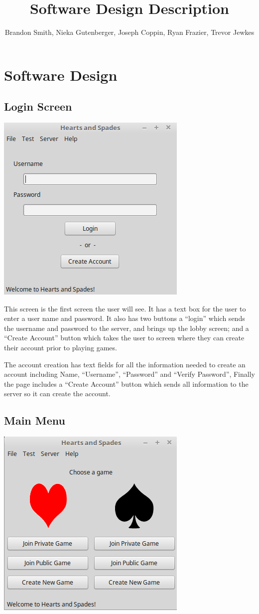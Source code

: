 \documentclass[]{scrartcl}
\title{Software Design Description}
\author{Brandon Smith, Nieka Gutenberger, Joseph Coppin, Ryan Frazier, Trevor Jewkes}
\begin{document}
\maketitle
\pagebreak
\section{Software Design}
\subsection{Login Screen}

\centerline{\includegraphics{LoginScreen.png}}

This screen is the first screen the user will see.  It has a text box for the user to enter a user name and password.  It also has two buttons a “login” which sends the username and password to the server, and brings up the lobby screen; and a “Create Account” button which takes the user to screen where they can create their account prior to playing games. 

The account creation has text fields for all the information needed to create an account including Name, “Username”, “Password”  and “Verify Password”,  Finally the page includes a “Create Account” button which sends all information to the server so it can create the account.  

\subsection{Main Menu}
\centerline{\includegraphics{SelectGame.png}}
\end{document}
